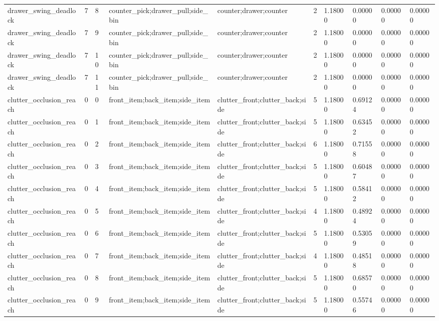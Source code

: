 \documentclass{article}
\begin{document}
\begin{table}[tbp]
{\begin{tabular}{llllllllll}
drawer\_swing\_deadlock & 7 & 8 & counter\_pick;drawer\_pull;side\_bin & counter;drawer;counter & 2 & 1.18000 & 0.00000 & 0.00000 & 0.00000 \\
drawer\_swing\_deadlock & 7 & 9 & counter\_pick;drawer\_pull;side\_bin & counter;drawer;counter & 2 & 1.18000 & 0.00000 & 0.00000 & 0.00000 \\
drawer\_swing\_deadlock & 7 & 10 & counter\_pick;drawer\_pull;side\_bin & counter;drawer;counter & 2 & 1.18000 & 0.00000 & 0.00000 & 0.00000 \\
drawer\_swing\_deadlock & 7 & 11 & counter\_pick;drawer\_pull;side\_bin & counter;drawer;counter & 2 & 1.18000 & 0.00000 & 0.00000 & 0.00000 \\
clutter\_occlusion\_reach & 0 & 0 & front\_item;back\_item;side\_item & clutter\_front;clutter\_back;side & 5 & 1.18000 & 0.69124 & 0.00000 & 0.00000 \\
clutter\_occlusion\_reach & 0 & 1 & front\_item;back\_item;side\_item & clutter\_front;clutter\_back;side & 5 & 1.18000 & 0.63452 & 0.00000 & 0.00000 \\
clutter\_occlusion\_reach & 0 & 2 & front\_item;back\_item;side\_item & clutter\_front;clutter\_back;side & 6 & 1.18000 & 0.71558 & 0.00000 & 0.00000 \\
clutter\_occlusion\_reach & 0 & 3 & front\_item;back\_item;side\_item & clutter\_front;clutter\_back;side & 5 & 1.18000 & 0.60487 & 0.00000 & 0.00000 \\
clutter\_occlusion\_reach & 0 & 4 & front\_item;back\_item;side\_item & clutter\_front;clutter\_back;side & 5 & 1.18000 & 0.58412 & 0.00000 & 0.00000 \\
clutter\_occlusion\_reach & 0 & 5 & front\_item;back\_item;side\_item & clutter\_front;clutter\_back;side & 4 & 1.18000 & 0.48924 & 0.00000 & 0.00000 \\
clutter\_occlusion\_reach & 0 & 6 & front\_item;back\_item;side\_item & clutter\_front;clutter\_back;side & 5 & 1.18000 & 0.53059 & 0.00000 & 0.00000 \\
clutter\_occlusion\_reach & 0 & 7 & front\_item;back\_item;side\_item & clutter\_front;clutter\_back;side & 4 & 1.18000 & 0.48518 & 0.00000 & 0.00000 \\
clutter\_occlusion\_reach & 0 & 8 & front\_item;back\_item;side\_item & clutter\_front;clutter\_back;side & 5 & 1.18000 & 0.68570 & 0.00000 & 0.00000 \\
clutter\_occlusion\_reach & 0 & 9 & front\_item;back\_item;side\_item & clutter\_front;clutter\_back;side & 5 & 1.18000 & 0.55746 & 0.00000 & 0.00000 \\

\end{tabular}}
\end{table}
\end{document}
